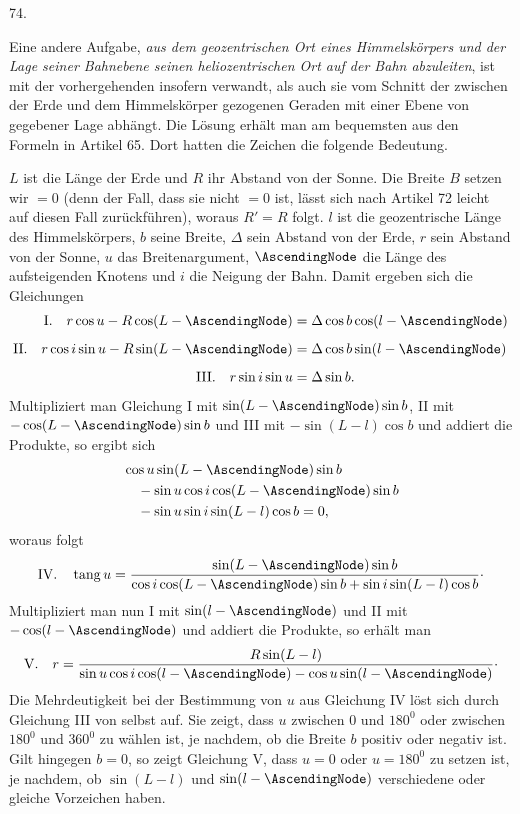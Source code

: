 \par{}\medskip
\hypertarget{native-097-article074}{}
\begin{center}74.\end{center}
Eine andere Aufgabe, \emph{aus dem geozentrischen Ort eines Himmelskörpers und der Lage seiner Bahnebene seinen heliozentrischen Ort auf der Bahn abzuleiten}, ist mit der vorhergehenden insofern verwandt, als auch sie vom Schnitt der zwischen der Erde und dem Himmelskörper gezogenen Geraden mit einer Ebene von gegebener Lage abhängt. Die Lösung erhält man am bequemsten aus den Formeln in Artikel 65. Dort hatten die Zeichen die folgende Bedeutung.

$L$ ist die Länge der Erde und $R$ ihr Abstand von der Sonne. Die Breite $B$ setzen wir $=0$ (denn der Fall, dass sie nicht $=0$ ist, lässt sich nach Artikel 72 leicht auf diesen Fall zurückführen), woraus $R'=R$ folgt. $l$ ist die geozentrische Länge des Himmelskörpers, $b$ seine Breite, $\Delta$ sein Abstand von der Erde, $r$ sein Abstand von der Sonne, $u$ das Breitenargument, $\AscendingNode$ die Länge des aufsteigenden Knotens und $i$ die Neigung der Bahn. Damit ergeben sich die Gleichungen
\[
\begin{aligned}
\mathrm{I.}\quad r\cos u-R\cos(L-\AscendingNode)&=\Delta\cos b\cos(l-\AscendingNode)\\[.5em]
\mathrm{II.}\quad r\cos i\sin u-R\sin(L-\AscendingNode)&=\Delta\cos b\sin(l-\AscendingNode)\\[.5em]
\mathrm{III.}\quad r\sin i\sin u&=\Delta\sin b.
\end{aligned}
\]
\noindent Multipliziert man Gleichung I mit $\sin(L-\AscendingNode)\sin b$, II mit $-\cos(L-\AscendingNode)\sin b$ und III mit $-\sin(L-l)\cos b$ und addiert die Produkte, so ergibt sich
\[
\begin{aligned}
&\cos u\sin(L-\AscendingNode)\sin b\\
&\quad-\sin u\cos i\cos(L-\AscendingNode)\sin b\\
&\quad-\sin u\sin i\sin(L-l)\cos b=0,
\end{aligned}
\]
\noindent woraus folgt
\[
\mathrm{IV.}\quad \operatorname{tang}u=\frac{\sin(L-\AscendingNode)\sin b}{\cos i\cos(L-\AscendingNode)\sin b+\sin i\sin(L-l)\cos b}\mathpunct{\cdot}
\]
\noindent {}Multipliziert man nun I mit $\sin(l-\AscendingNode)$ und II mit $-\cos(l-\AscendingNode)$ und addiert die Produkte, so erhält man
\[
\mathrm{V.}\quad r=\frac{R\sin(L-l)}{\sin u\cos i\cos(l-\AscendingNode)-\cos u\sin(l-\AscendingNode)}\mathpunct{\cdot}
\]
\noindent Die Mehrdeutigkeit bei der Bestimmung von $u$ aus Gleichung IV löst sich durch Gleichung III von selbst auf. Sie zeigt, dass $u$ zwischen $0$ und $180^0$ oder zwischen $180^0$ und $360^0$ zu wählen ist, je nachdem, ob die Breite $b$ positiv oder negativ ist. Gilt hingegen $b=0$, so zeigt Gleichung V, dass $u=0$ oder $u=180^0$ zu setzen ist, je nachdem, ob $\sin(L-l)$ und $\sin(l-\AscendingNode)$ verschiedene oder gleiche Vorzeichen haben.

